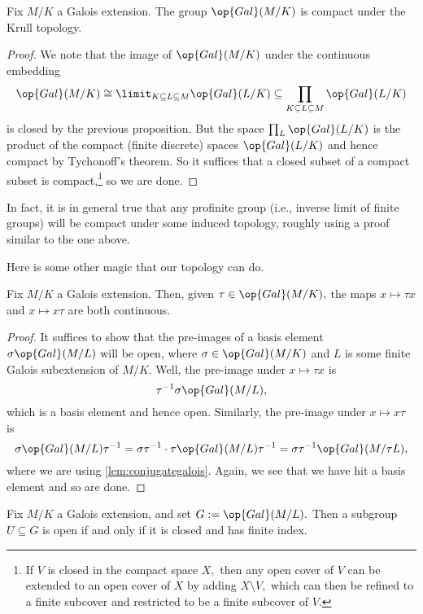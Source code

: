 \documentclass[../notes.tex]{subfiles}
\begin{document}
\begin{theorem}
	Fix $M/K$ a Galois extension. The group $\op{Gal}(M/K)$ is compact under the Krull topology.
\end{theorem}
\begin{proof}
	We note that the image of $\op{Gal}(M/K)$ under the continuous embedding
	\[\op{Gal}(M/K)\cong\limit_{K\subseteq L\subseteq M}\op{Gal}(L/K)\subseteq\prod_{K\subseteq L\subseteq M}\op{Gal}(L/K)\]
	is closed by the previous proposition. But the space $\prod_L\op{Gal}(L/K)$ is the product of the compact (finite discrete) spaces $\op{Gal}(L/K)$ and hence compact by Tychonoff's theorem. So it suffices that a closed subset of a compact subset is compact,\footnote{If $V$ is closed in the compact space $X,$ then any open cover of $V$ can be extended to an open cover of $X$ by adding $X\setminus V,$ which can then be refined to a finite subcover and restricted to be a finite subcover of $V.$} so we are done.
\end{proof}
\begin{remark}
	In fact, it is in general true that any profinite group (i.e., inverse limit of finite groups) will be compact under some induced topology, roughly using a proof similar to the one above.
\end{remark}
Here is some other magic that our topology can do.
\begin{proposition}
	Fix $M/K$ a Galois extension. Then, given $\tau\in\op{Gal}(M/K),$ the maps $x\mapsto\tau x$ and $x\mapsto x\tau$ are both continuous.
\end{proposition}
\begin{proof}
	It suffices to show that the pre-images of a basis element $\sigma\op{Gal}(M/L)$ will be open, where $\sigma\in\op{Gal}(M/K)$ and $L$ is some finite Galois subextension of $M/K.$ Well, the pre-image under $x\mapsto\tau x$ is
	\[\tau^{-1}\sigma\op{Gal}(M/L),\]
	which is a basis element and hence open. Similarly, the pre-image under $x\mapsto x\tau$ is
	\[\sigma\op{Gal}(M/L)\tau^{-1}=\sigma\tau^{-1}\cdot\tau\op{Gal}(M/L)\tau^{-1}=\sigma\tau^{-1}\op{Gal}(M/\tau L),\]
	where we are using \autoref{lem:conjugategalois}. Again, we see that we have hit a basis element and so are done.
\end{proof}
\begin{proposition}
	Fix $M/K$ a Galois extension, and set $G:=\op{Gal}(M/L).$ Then a subgroup $U\subseteq G$ is open if and only if it is closed and has finite index.
\end{proposition}
\end{document}
